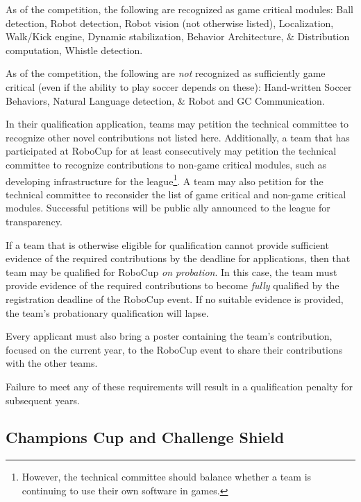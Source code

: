 As of the \RCYear competition, the following are recognized as game critical modules:
Ball detection, Robot detection, Robot vision (not otherwise listed), Localization, Walk/Kick engine, Dynamic stabilization, Behavior Architecture, \& Distribution computation, Whistle detection.

As of the \RCYear competition, the following are \textit{not} recognized as sufficiently game critical (even if the ability to play soccer depends on these):
Hand-written Soccer Behaviors, Natural Language detection, \& Robot and GC Communication.

In their qualification application, teams may petition the technical committee to recognize other novel contributions not listed here.
Additionally, a team that has participated at RoboCup for at least \NovelContributionTime consecutively may petition the technical committee to recognize contributions to non-game critical modules, such as developing infrastructure for the league\footnote{However, the technical committee should balance whether a team is continuing to use their own software in games.}.
A team may also petition for the technical committee to reconsider the list of game critical and non-game critical modules.
Successful petitions will be public ally announced to the league for transparency.

If a team that is otherwise eligible for qualification cannot provide sufficient evidence of the required contributions by the deadline for applications, then that team may be qualified for RoboCup \textit{on probation}.
In this case, the team must provide evidence of the required contributions to become \textit{fully} qualified by the registration deadline of the RoboCup event.
If no suitable evidence is provided, the team's probationary qualification will lapse.

Every applicant must also bring a poster containing the team's contribution, focused on the current year, to the RoboCup event to share their contributions with the other teams.

Failure to meet any of these requirements will result in a qualification penalty for subsequent years.

\subsection{Champions Cup and Challenge Shield}
\label{sec:cc_and_cs}

